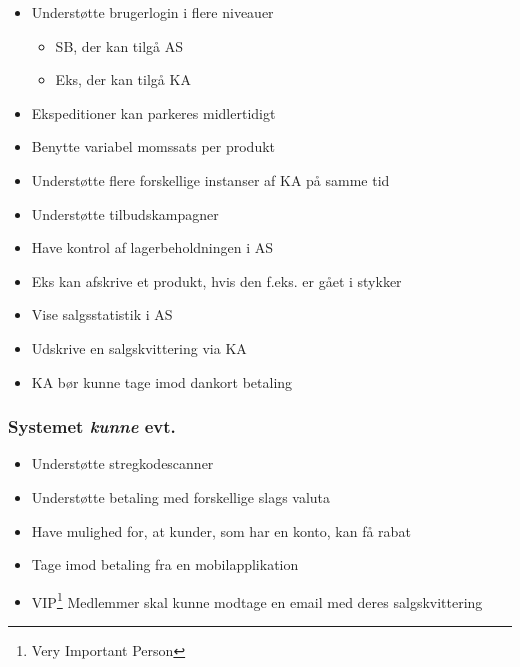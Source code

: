 \begin{itemize}

\item Understøtte brugerlogin i flere niveauer
\begin{itemize}
\item  \gls{SB}, der kan tilgå \gls{AS}\\
\item  \gls{Eks}, der kan tilgå \gls{KA}
\end{itemize}
\item Ekspeditioner kan parkeres midlertidigt
\item Benytte variabel momssats per produkt
\item Understøtte flere forskellige instanser af \gls{KA} på samme tid
\item Understøtte tilbudskampagner
\item Have kontrol af lagerbeholdningen i \gls{AS}
\item \gls{Eks} kan afskrive et produkt, hvis den f.eks. er gået i stykker
\item Vise salgsstatistik i \gls{AS}
\item Udskrive en salgskvittering via \gls{KA}
\item \gls{KA} bør kunne tage imod dankort betaling

\end{itemize}


\subsubsection*{Systemet \textit{kunne} evt.}

\begin{itemize}

\item Understøtte stregkodescanner
\item Understøtte betaling med forskellige slags valuta
\item Have mulighed for, at kunder, som har en konto, kan få rabat
\item Tage imod betaling fra en mobilapplikation
\item VIP\footnote{Very Important Person} Medlemmer skal kunne modtage en email med deres salgskvittering

\end{itemize}